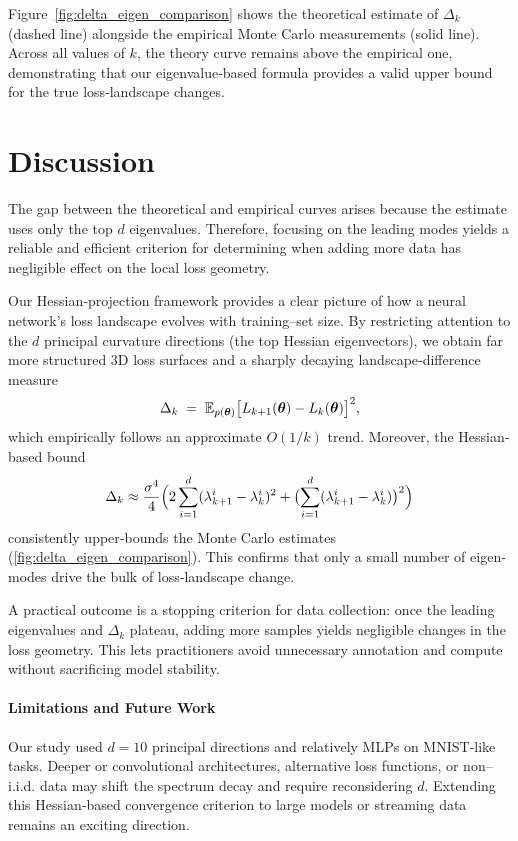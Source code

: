 \documentclass{article}
\begin{document}
Figure~\ref{fig:delta_eigen_comparison} shows the theoretical estimate of $\Delta_k$ (dashed line) alongside the empirical Monte Carlo
measurements (solid line).  Across all values of $k$, the theory curve remains above the empirical one, demonstrating that our
eigenvalue‐based formula provides a valid upper bound for the true loss‐landscape changes.


\section{Discussion}\label{sec:disc}

The gap between the theoretical and empirical curves arises because the estimate uses only the top $d$ eigenvalues.
Therefore, focusing on the leading modes yields a reliable and efficient criterion for determining when
adding more data has negligible effect on the local loss geometry.

Our Hessian‐projection framework provides a clear picture of how a neural network’s loss landscape evolves with training–set size.
By restricting attention to the $d$ principal curvature directions (the top Hessian eigenvectors), we obtain far more structured 3D
loss surfaces and a sharply decaying landscape‐difference measure
$$
  \Delta_k \;=\; \mathbb{E}_{p(\boldsymbol{\theta})}\bigl[L_{k+1}(\boldsymbol{\theta})-L_k(\boldsymbol{\theta})\bigr]^2,
$$
which empirically follows an approximate $O(1/k)$ trend.  Moreover, the Hessian‐based bound
$$
  \Delta_k\approx\frac{\sigma^4}{4}\Bigl(2\sum_{i=1}^d(\lambda^i_{k+1}-\lambda^i_k)^2
  +\bigl(\sum_{i=1}^d(\lambda^i_{k+1}-\lambda^i_k)\bigr)^2\Bigr)
$$
consistently upper‐bounds the Monte Carlo estimates (\ref{fig:delta_eigen_comparison}). This confirms that only a small number of
eigen‐modes drive the bulk of loss‐landscape change.

A practical outcome is a stopping criterion for data collection: once the leading eigenvalues and $\Delta_k$ plateau,
adding more samples yields negligible changes in the loss geometry.  This lets practitioners avoid unnecessary annotation and
compute without sacrificing model stability.

\paragraph{Limitations and Future Work}
Our study used $d=10$ principal directions and relatively MLPs on MNIST‐like tasks. Deeper or convolutional architectures,
alternative loss functions, or non–i.i.d. data may shift the spectrum decay and require reconsidering $d$. Extending this Hessian‐based
convergence criterion to large models or streaming data remains an exciting direction.
\end{document}
